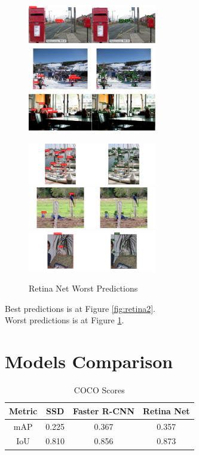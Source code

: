 \documentclass[12pt]{article}
\begin{document}
\begin{figure}[htbp]
    {\raggedright
    \includegraphics[width=0.5\textwidth]{images/retina_res/retina_w1.png}
    \includegraphics[width=0.5\textwidth]{images/retina_res/retina_w2.png}
    \includegraphics[width=0.5\textwidth]{images/retina_res/retina_w3.png}}
    {\raggedleft
    \includegraphics[width=0.5\textwidth]{images/retina_res/retina_w4.png}
    \includegraphics[width=0.5\textwidth]{images/retina_res/retina_w5.png}
    \includegraphics[width=0.5\textwidth]{images/retina_res/retina_w6.png}}
    \caption{Retina Net Worst Predictions}
    \label{fig:retina3}
\end{figure}

Best predictions is at Figure \ref{fig:retina2}.
\\
Worst predictions is at Figure \ref{fig:retina3}.
\newpage
\section{Models Comparison}
\begin{table}[h]
    \centering
    \begin{tabular}{|c|c|c|c|}
    \hline
    Metric & SSD & Faster R-CNN & Retina Net \\ \hline
    mAP & 0.225 & 0.367 & 0.357 \\ \hline
    IoU & 0.810 & 0.856 & 0.873 \\ \hline
    \end{tabular}
    \caption{COCO Scores}
    \label{table1}
\end{table}
\end{document}
